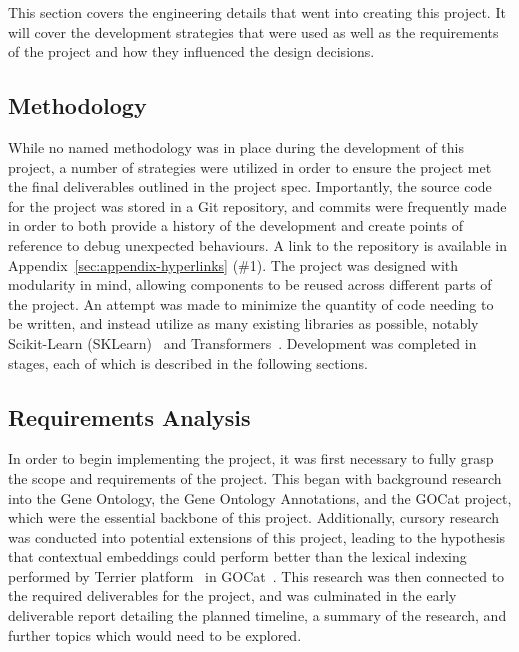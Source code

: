 \documentclass[11pt]{article}
\theoremstyle{plain}
\theoremstyle{definition}
\begin{document}
This section covers the engineering details that went into creating this project. It will cover the development strategies that were used as well as the requirements of the project and how they influenced the design decisions.

\subsection{Methodology}\label{sec:development-methodology}

While no named methodology was in place during the development of this project, a number of strategies were utilized in order to ensure the project met the final deliverables outlined in the project spec. Importantly, the source code for the project was stored in a Git repository, and commits were frequently made in order to both provide a history of the development and create points of reference to debug unexpected behaviours. A link to the repository is available in Appendix~\ref{sec:appendix-hyperlinks} (\#1).  The project was designed with modularity in mind, allowing components to be reused across different parts of the project. An attempt was made to minimize the quantity of code needing to be written, and instead utilize as many existing libraries as possible, notably Scikit-Learn (SKLearn)~\cite{pedregosa/2011/scikit-learn} and Transformers~\cite{wolf/2020/transformers}. Development was completed in stages, each of which is described in the following sections.

\subsection{Requirements Analysis}\label{sec:development-analysis}

In order to begin implementing the project, it was first necessary to fully grasp the scope and requirements of the project. This began with background research into the Gene Ontology, the Gene Ontology Annotations, and the GOCat project, which were the essential backbone of this project. Additionally, cursory research was conducted into potential extensions of this project, leading to the hypothesis that contextual embeddings could perform better than the lexical indexing performed by Terrier platform~\cite{ounis/2006/terrier} in GOCat~\cite{gobeill/2013/managing}. This research was then connected to the required deliverables for the project, and was culminated in the early deliverable report detailing the planned timeline, a summary of the research, and further topics which would need to be explored.
\end{document}

